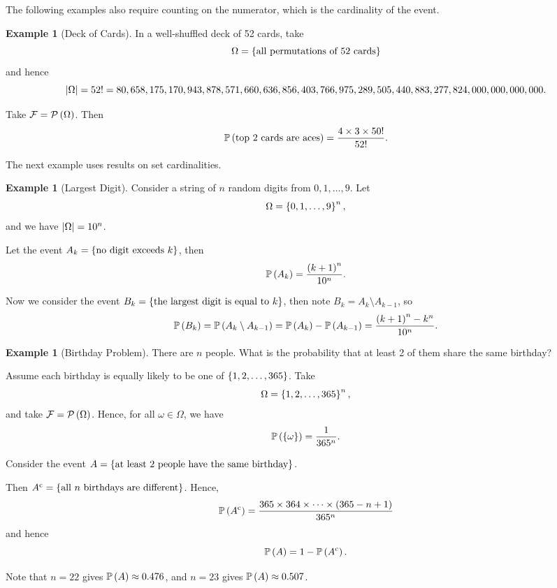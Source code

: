 \documentclass{article}
\theoremstyle{definition}
\newtheorem{example}[theorem]{Example}
\theoremstyle{remark}
\DeclarePairedDelimiter{\abs}{\lvert}{\rvert}
\newcommand{\Prob}{\mathbb{P}}
\newcommand{\eventSpace}{\mathcal{F}}
\newcommand{\powerset}{\mathcal{P}}
\newcommand{\compl}{^{\mathrm{c}}}
\begin{document}
The following examples also require counting on the numerator, which is the cardinality of the event.

\begin{example}[Deck of Cards]
    \label{ex:deck-of-cards}%
    In a well-shuffled deck of 52 cards, take
    \[
        \Omega = \left\{\text{all permutations of 52 cards}\right\}
    \]
    and hence
    \[
        \abs{\Omega} = 52! = 80,658,175,170,943,878,571,660,636,856,403,766,975,289,505,440,883,277,824,000,000,000,000.
    \]
    
    Take \(\eventSpace = \powerset\pqty{\Omega}\). Then
    \[
        \Prob\pqty{\text{top 2 cards are aces}} = \frac{4 \times 3 \times 50!}{52!}.
    \]
\end{example}

The next example uses results on set cardinalities.

\begin{example}[Largest Digit]
    \label{ex:largest-digit}%
    Consider a string of \(n\) random digits from \(0, 1, \ldots, 9\). Let
    \[
        \Omega = \left\{0, 1, \ldots, 9\right\}^n,
    \]
    and we have \(\abs{\Omega} = 10^n\).

    Let the event \(A_k = \left\{\text{no digit exceeds }k\right\}\), then
    \[
        \Prob\pqty{A_k} = \frac{\pqty{k + 1}^{n}}{10^n}.
    \]

    Now we consider the event \(B_k = \left\{\text{the largest digit is equal to }k\right\}\), then note \(B_k = A_k \setminus A_{k - 1}\), so
    \[
        \Prob\pqty{B_k} = \Prob\pqty{A_k \setminus A_{k - 1}} = \Prob\pqty{A_k} - \Prob\pqty{A_{k - 1}} = \frac{\pqty{k + 1}^n - k^n}{10^n}.
    \]
\end{example}

\begin{example}[Birthday Problem]
    \label{ex:birthbay-problem}%
    There are \(n\) people. What is the probability that at least 2 of them share the same birthday?
        
    Assume each birthday is equally likely to be one of \(\left\{1, 2, \ldots, 365\right\}\). Take
    \[
        \Omega = \left\{1, 2, \ldots, 365\right\}^n,
    \]
    and take \(\eventSpace = \powerset\pqty{\Omega}\). Hence, for all \(\omega \in \Omega\), we have
    \[
        \Prob\pqty{\Bqty{\omega}} = \frac{1}{365^n}.
    \]

    Consider the event \(A = \left\{\text{at least 2 people have the same birthday}\right\}\).

    Then \(A\compl = \Bqty{\text{all }n\text{ birthdays are different}}\). Hence,
    \[
        \Prob\pqty{A\compl} = \frac{365 \times 364 \times \cdots \times \pqty{365 - n + 1}}{365^n}
    \]
    and hence
    \[
        \Prob\pqty{A} = 1 - \Prob\pqty{A\compl}.
    \]

    Note that \(n = 22\) gives \(\Prob\pqty{A} \approx 0.476\), and \(n = 23\) gives \(\Prob\pqty{A} \approx 0.507\).
\end{example}
\end{document}
